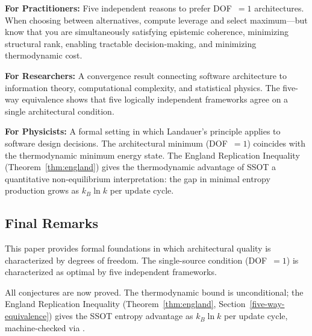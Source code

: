 \textbf{For Practitioners:} Five independent reasons to prefer DOF~$= 1$ architectures. When choosing between alternatives, compute leverage and select maximum---but know that you are simultaneously satisfying epistemic coherence, minimizing structural rank, enabling tractable decision-making, and minimizing thermodynamic cost.

\textbf{For Researchers:} A convergence result connecting software architecture to information theory, computational complexity, and statistical physics. The five-way equivalence shows that five logically independent frameworks agree on a single architectural condition.

\textbf{For Physicists:} A formal setting in which Landauer's principle applies to software design decisions. The architectural minimum (DOF~$= 1$) coincides with the thermodynamic minimum energy state. The England Replication Inequality (Theorem~\ref{thm:england}) gives the thermodynamic advantage of SSOT a quantitative non-equilibrium interpretation: the gap in minimal entropy production grows as $k_B \ln k$ per update cycle.

\subsection{Final Remarks}

This paper provides formal foundations in which architectural quality is characterized by degrees of freedom. The single-source condition (DOF~$= 1$) is characterized as optimal by five independent frameworks.

All conjectures are now proved. The thermodynamic bound is unconditional; the England Replication Inequality (Theorem~\ref{thm:england}, Section~\ref{five-way-equivalence}) gives the SSOT entropy advantage as $k_B \ln k$ per update cycle, machine-checked via .


\appendix
